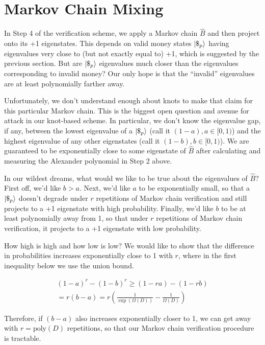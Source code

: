 \section{Markov Chain Mixing}

In Step 4 of the verification scheme, we apply a Markov chain
$\hat{B}$ and then
project onto its +1 eigenstates. This depends on valid money states
$|\$_p \rangle$
having eigenvalues very close to (but not exactly equal to) +1,
which is suggested by the previous
section. But are $|\$_p \rangle$ eigenvalues much closer than
the eigenvalues corresponding to invalid money?
Our only
hope is
that the ``invalid'' eigenvalues
are at least
polynomially farther away.

Unfortunately, we don't understand enough about knots to make that
claim for this particular Markov chain. This is the biggest open
question and avenue for attack in our knot-based scheme.
In particular, we don't know
the eigenvalue gap, if any, between the lowest eigenvalue of
a $|\$_p \rangle$ (call it $(1-a), a \in [0,1)$) and the highest eigenvalue of any other
eigenstates (call it $(1-b), b \in [0,1)$). We are guaranteed to be exponentially close
to some eigenstate of $\hat{B}$ after calculating and measuring the
Alexander polynomial in Step 2 above.

In our wildest dreams, what would we like to be true about the eigenvalues
of $\hat{B}$?
First off, we'd like $b > a$. Next, we'd like $a$ to be
exponentially small, so that a $|\$_p \rangle$ doesn't degrade under
$r$ repetitions of Markov chain verification and still projects
to a +1 eigenstate with high probability.
Finally, we'd like $b$ to be at least polynomially away from 1, so
that under $r$ repetitions of Markov chain verification, it
projects to a +1 eigenstate with low probability.


How high is high and how low is low?
We would like to show that the difference in probabilities increases
exponentially close to 1 with $r$, where in the first inequality below
we use the union bound.

\begin{multline*}
(1-a)^r - (1-b)^r \ge (1 - ra) - (1 - rb) \\
= r(b-a) =
r \left(\tfrac{1}{\exp(\Omega(D))} - \tfrac{1}{\Omega(D)}\right)
\end{multline*}

Therefore, if $(b-a)$ also increases exponentially closer to 1, we can
get away with $r = \textrm{poly}(D)$ repetitions, so that our
Markov chain verification procedure is tractable.